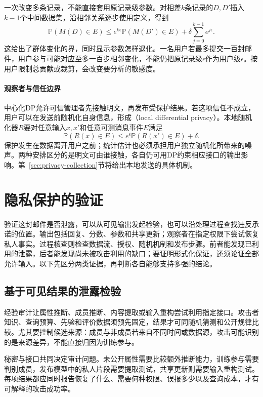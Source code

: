 一次改变多条记录，不能直接套用原记录级参数。对相差$k$条记录的$D,D'$插入$k-1$个中间数据集，沿相邻关系逐步使用定义，得到
\begin{equation}
 \mathbb P(M(D)\in E)
 \leq e^{k\epsilon}\mathbb P(M(D')\in E)
   +\delta\sum_{j=0}^{k-1}e^{j\epsilon}.
 \label{eq:privacy-group-bound}
\end{equation}
这给出了群体变化的界，同时显示参数怎样退化。一名用户若最多提交一百封邮件，用户参与可能对应至多一百步相邻变化，不能仍把原记录级$\epsilon$作为用户级$\epsilon$。按用户限制总贡献或裁剪，会改变要分析的敏感度。

\paragraph{观察者与信任边界}

中心化DP允许可信管理者先接触明文，再发布受保护结果。若这项信任不成立，用户可以在发送前随机化自身信息，形成（local differential privacy）。本地随机化器$R$要对任意输入$x,x'$和任意可测消息事件$E$满足
\[
 \mathbb P(R(x)\in E)
 \leq e^\epsilon\mathbb P(R(x')\in E)+\delta.
\]
保护发生在数据离开用户之前；统计估计也必须承担用户独立随机化所带来的噪声。两种安排区分的是明文可由谁接触，各自仍可用DP约束相应接口的输出影响。第~\ref{sec:privacy-collection}节将给出本地发送的具体机制。

\section{隐私保护的验证}
\label{sec:privacy-verification}

验证这封邮件是否泄露，可以从可见输出发起检验，也可以沿处理过程查找违反承诺的位置。输出包括回复、分数、参数和共享更新；观察者在指定权限下尝试恢复私人事实。过程核查则检查数据流、授权、随机机制和发布步骤。前者能发现已利用的泄露，后者能发现尚未被攻击利用的缺口；要证明形式化保证，还须论证全部允许输入。以下先区分两类证据，再判断各自能够支持多强的结论。

\subsection{基于可见结果的泄露检验}
\label{sec:privacy-leakage-audit}

经验审计让属性推断、成员推断、内容提取或输入重构尝试利用指定接口。攻击者知识、查询预算、先验和评价数据须预先固定，结果才可同随机猜测和公开规律比较。尤其要控制候选来源：成员与非成员若来自不同时间或数据源，攻击可能识别的是来源差异，不能直接归因为训练参与。

秘密与接口共同决定审计问题。未公开属性需要比较额外推断能力，训练参与需要判别成员，发布模型中的私人片段需要提取测试，共享更新则需要输入重构测试。每项结果都应同时报告恢复了什么、需要何种权限、误报多少以及查询成本，才有可解释的攻击成功率。

